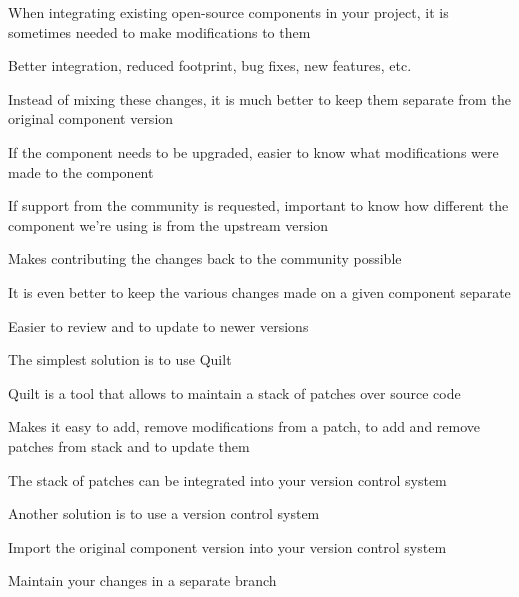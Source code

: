   \startitemize
  \item When integrating existing open-source components in your
    project, it is sometimes needed to make modifications to them
    \startitemize
    \item Better integration, reduced footprint, bug fixes, new
      features, etc.
    \stopitemize
  \item Instead of mixing these changes, it is much better to keep
    them separate from the original component version
    \startitemize
    \item If the component needs to be upgraded, easier to know what
      modifications were made to the component
    \item If support from the community is requested, important to
      know how different the component we're using is from the
      upstream version
    \item Makes contributing the changes back to the community
      possible
    \stopitemize
  \item It is even better to keep the various changes made on a given
    component separate
    \startitemize
    \item Easier to review and to update to newer versions
    \stopitemize
  \stopitemize

  \startitemize
  \item The simplest solution is to use Quilt
    \startitemize
    \item Quilt is a tool that allows to maintain a stack of patches
      over source code
    \item Makes it easy to add, remove modifications from a patch, to
      add and remove patches from stack and to update them
    \item The stack of patches can be integrated into your version
      control system
    \item {}
    \stopitemize
  \item Another solution is to use a version control system
    \startitemize
    \item Import the original component version into your version
      control system
    \item Maintain your changes in a separate branch
    \stopitemize
  \stopitemize


